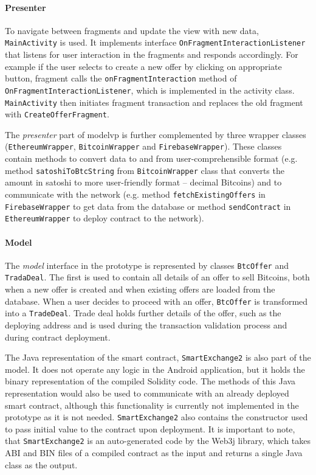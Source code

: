 \paragraph{Presenter} 
\begin{sloppypar}
To navigate between fragments and update the view with new data, \texttt{MainActivity} is used. It implements interface \texttt{OnFragmentInteractionListener} that listens for user interaction in the fragments and responds accordingly. For example if the user selects to create a new offer by clicking on appropriate button, fragment calls the \texttt{onFragmentInteraction} method of \texttt{OnFragmentInteractionListener}, which is implemented in the activity class. \texttt{MainActivity} then initiates fragment transaction and replaces the old fragment with \texttt{CreateOfferFragment}.

The \textit{presenter} part of \acrshort{modelvp} is further complemented by three wrapper classes (\texttt{EthereumWrapper}, \texttt{BitcoinWrapper} and \texttt{FirebaseWrapper}). These classes contain methods to convert data to and from user-comprehensible format (e.g. method \texttt{satoshiToBtcString} from \texttt{BitcoinWrapper} class that converts the amount in satoshi to more user-friendly format -- decimal Bitcoins) and to communicate with the network (e.g. method \texttt{fetchExistingOffers} in \texttt{FirebaseWrapper} to get data from the database or method \texttt{sendContract} in \texttt{EthereumWrapper} to deploy contract to the network).
\end{sloppypar}

\paragraph{Model}
The \textit{model} interface in the prototype is represented by classes \texttt{BtcOffer} and \texttt{TradaDeal}. The first is used to contain all details of an offer to sell Bitcoins, both when a new offer is created and when existing offers are loaded from the database. When a user decides to proceed with an offer, \texttt{BtcOffer} is transformed into a \texttt{TradeDeal}. Trade deal holds further details of the offer, such as the deploying address and is used during the transaction validation process and during contract deployment.

The Java representation of the smart contract, \texttt{SmartExchange2} is also part of the model. It does not operate any logic in the Android application, but it holds the binary representation of the compiled Solidity code. The methods of this Java representation would also be used to communicate with an already deployed smart contract, although this functionality is currently not implemented in the prototype as it is not needed. \texttt{SmartExchange2} also contains the constructor used to pass initial value to the contract upon deployment. It is important to note, that \texttt{SmartExchange2} is an auto-generated code by the Web3j library, which takes ABI and BIN files of a compiled contract as the input and returns a single Java class as the output.

